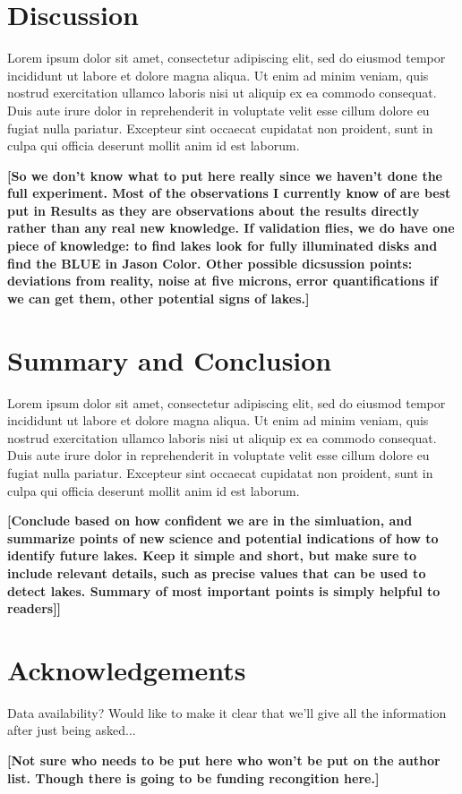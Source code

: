 \documentclass{article}
\begin{document}
\section{Discussion}
Lorem ipsum dolor sit amet, consectetur adipiscing elit, sed do eiusmod tempor incididunt ut labore et dolore magna aliqua. Ut enim ad minim veniam, quis nostrud exercitation ullamco laboris nisi ut aliquip ex ea commodo consequat. Duis aute irure dolor in reprehenderit in voluptate velit esse cillum dolore eu fugiat nulla pariatur. Excepteur sint occaecat cupidatat non proident, sunt in culpa qui officia deserunt mollit anim id est laborum.

\textbf{\color{red}[So we don't know what to put here really since we haven't done the full experiment. Most of the observations I currently know of are best put in Results as they are observations about the results directly rather than any real new knowledge. If validation flies, we do have one piece of knowledge: to find lakes look for fully illuminated disks and find the BLUE in Jason Color. Other possible dicsussion points: deviations from reality, noise at five microns, error quantifications if we can get them, other potential signs of lakes.]
\color{black}}

\section{Summary and Conclusion}
Lorem ipsum dolor sit amet, consectetur adipiscing elit, sed do eiusmod tempor incididunt ut labore et dolore magna aliqua. Ut enim ad minim veniam, quis nostrud exercitation ullamco laboris nisi ut aliquip ex ea commodo consequat. Duis aute irure dolor in reprehenderit in voluptate velit esse cillum dolore eu fugiat nulla pariatur. Excepteur sint occaecat cupidatat non proident, sunt in culpa qui officia deserunt mollit anim id est laborum. 

\textbf{\color{red}[Conclude based on how confident we are in the simluation, and summarize points of new science and potential indications of how to identify future lakes. Keep it simple and short, but make sure to include relevant details, such as precise values that can be used to detect lakes. Summary of most important points is simply helpful to readers]]\color{black}}

\section*{Acknowledgements}

\color{Green}Data availability? Would like to make it clear that we'll give all the information after just being asked...\color{black}

\textbf{\color{red}[Not sure who needs to be put here who won't be put on the author list. Though there is going to be funding recongition here.]\color{black}}

\printbibliography
\end{document}
